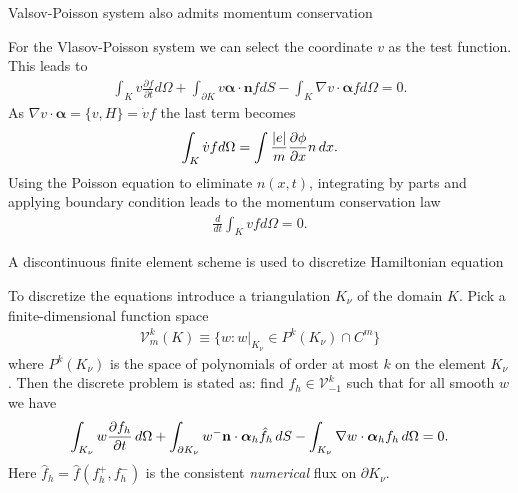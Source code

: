\documentclass[pdf]{beamer}
\newcommand{\pfrac}[2]{\frac{\partial #1}{\partial #2}}
\newcommand{\mvec}[1]{\mathbf{#1}}
\newcommand{\gvec}[1]{\boldsymbol{#1}}
\theoremstyle{definition}
\begin{document}
\begin{frame}{Valsov-Poisson system also admits momentum
    conservation}%
  
  For the Vlasov-Poisson system we can select the coordinate $v$ as
  the test function. This leads to
  \begin{align*}
    \int_K v\pfrac{f}{t}d\Omega 
    + \int_{\partial K}v \gvec{\alpha}\cdot\mvec{n}f dS
    - \int_K \nabla v \cdot \gvec{\alpha} f d\Omega
    = 0.
  \end{align*}
  As $\nabla v \cdot \gvec{\alpha} = \{v,H\} = \dot{v}f$ the last term
  becomes
  \begin{align*}
    \int_K\dot{v} f d\Omega = \int \frac{|e|}{m} \pfrac{\phi}{x} n\thinspace dx.
  \end{align*}
  Using the Poisson equation to eliminate $n(x,t)$, integrating by
  parts and applying boundary condition leads to the momentum
  conservation law
  \begin{align*}
    \frac{d}{dt}\int_K vf d\Omega = 0.
  \end{align*} 
\end{frame}

\begin{frame}{A discontinuous finite element scheme is used to
    discretize Hamiltonian equation}

  To discretize the equations introduce a triangulation $K_\nu$ of the
  domain $K$. Pick a finite-dimensional function space
  \begin{align*}
    \mathcal{V}^k_m(K) \equiv \{w: w|_{K_\nu} \in P^k(K_\nu) \cap
    C^m\}
  \end{align*}
  where $P^k(K_\nu)$ is the space of polynomials of order at most $k$
  on the element $K_\nu$. Then the discrete problem is stated as: find
  $f_h\in \mathcal{V}^k_{-1}$ such that for all smooth $w$ we have
  \begin{align*}
    \int_{K_\nu} w \pfrac{f_h}{t}\thinspace d\Omega 
    +
    \int_{\partial K_\nu}w^- \mvec{n}\cdot\gvec{\alpha}_h\hat{f}_h\thinspace dS
    -
    \int_{K_\nu} \nabla w\cdot\gvec{\alpha}_h f_h\thinspace d\Omega = 0.
  \end{align*}
  Here $\hat{f}_h = \hat{f}(f^+_h,f^-_h)$ is the consistent
  \emph{numerical} flux on $\partial K_\nu$.
\end{frame}
\end{document}
